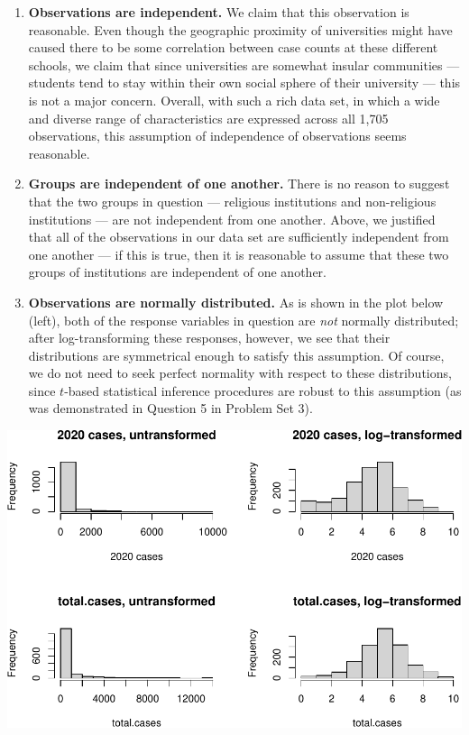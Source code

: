 \documentclass[
]{article}
\begin{document}
\begin{enumerate}
\def\labelenumi{\arabic{enumi})}
\item
  \textbf{Observations are independent.} We claim that this observation
  is reasonable. Even though the geographic proximity of universities
  might have caused there to be some correlation between case counts at
  these different schools, we claim that since universities are somewhat
  insular communities --- students tend to stay within their own social
  sphere of their university --- this is not a major concern. Overall,
  with such a rich data set, in which a wide and diverse range of
  characteristics are expressed across all 1,705 observations, this
  assumption of independence of observations seems reasonable.
\item
  \textbf{Groups are independent of one another.} There is no reason to
  suggest that the two groups in question --- religious institutions and
  non-religious institutions --- are not independent from one another.
  Above, we justified that all of the observations in our data set are
  sufficiently independent from one another --- if this is true, then it
  is reasonable to assume that these two groups of institutions are
  independent of one another.
\item
  \textbf{Observations are normally distributed.} As is shown in the
  plot below (left), both of the response variables in question are
  \emph{not} normally distributed; after log-transforming these
  responses, however, we see that their distributions are symmetrical
  enough to satisfy this assumption. Of course, we do not need to seek
  perfect normality with respect to these distributions, since
  \(t\)-based statistical inference procedures are robust to this
  assumption (as was demonstrated in Question 5 in Problem Set 3).
\end{enumerate}

\includegraphics{final_files/figure-latex/unnamed-chunk-8-1.pdf}
\end{document}
